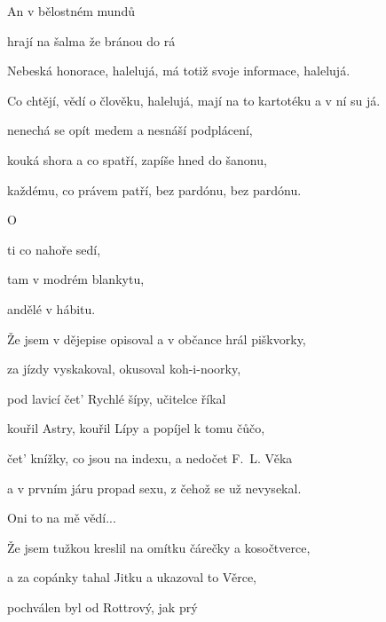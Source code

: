 

 

\zr
An  v bělostném mundů 

hrají na šalma  že bránou do rá  

Nebeská honorace, halelujá, má totiž svoje informace, halelujá.

Co chtějí, vědí o člověku, halelujá, mají na to kartotéku a v ní su já.

\kr

\zs
{}       

nenechá se opít medem a nesnáší podplácení,

kouká shora a co spatří, zapíše hned do šanonu,

každému, co právem patří, bez pardónu, bez pardónu.

O   

ti co nahoře sedí,

tam v modrém blankytu,

andělé v hábitu.

\ks

\zr\kr

\zs
Že jsem v dějepise opisoval a v občance hrál piškvorky,

za jízdy vyskakoval, okusoval koh-i-noorky,

pod lavicí čet' Rychlé šípy, učitelce říkal 

kouřil Astry, kouřil Lípy a popíjel k tomu čůčo,

čet' knížky, co jsou na indexu, a nedočet F.~L. Věka

a v prvním járu propad sexu, z čehož se už nevysekal.

Oni to na mě vědí...
\ks

\zr\kr

\zs
Že jsem tužkou kreslil na omítku čárečky a kosočtverce,

a za copánky tahal Jitku a ukazoval to Věrce,

pochválen byl od Rottrový, jak prý 

